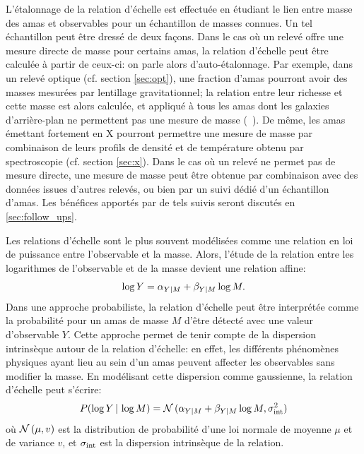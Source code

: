 L'étalonnage de la relation d'échelle est effectuée en étudiant le lien entre masse des amas et observables pour un échantillon de masses connues.
Un tel échantillon peut être dressé de deux façons.
Dans le cas où un relevé offre une mesure directe de masse pour certains amas, la relation d'échelle peut être calculée à partir de ceux-ci: on parle alors d'auto-étalonnage.
Par exemple, dans un relevé optique (cf. section \ref{sec:opt}), une fraction d'amas pourront avoir des masses mesurées par lentillage gravitationnel; la relation entre leur richesse et cette masse est alors calculée, et appliqué à tous les amas dont les galaxies d'arrière-plan ne permettent pas une mesure de masse (\eg\ \cite{andreon_richness-mass_2012}).
De même, les amas émettant fortement en X pourront permettre une mesure de masse par combinaison de leurs profils de densité et de température obtenu par spectroscopie (cf. section \ref{sec:x}).
Dans le cas où un relevé ne permet pas de mesure directe, une mesure de masse peut être obtenue par combinaison avec des données issues d'autres relevés, ou bien par un suivi dédié d'un échantillon d'amas.
Les bénéfices apportés par de tels suivis seront discutés en \ref{sec:follow_ups}.

Les relations d'échelle sont le plus souvent modélisées comme une relation en loi de puissance entre l'observable et la masse.
Alors, l'étude de la relation entre les logarithmes de l'observable et de la masse devient une relation affine:
\begin{equation}
    \label{eq:scaling_noproba}
    \log Y = \alpha_{Y|M} + \beta_{Y|M} \log M.
\end{equation}
Dans une approche probabiliste, la relation d'échelle peut être interprétée comme la probabilité pour un amas de masse $M$ d'être détecté avec une valeur d'observable $Y$.
Cette approche permet de tenir compte de la dispersion intrinsèque autour de la relation d'échelle: en effet, les différents phénomènes physiques ayant lieu au sein d'un amas peuvent affecter les observables sans modifier la masse.
En modélisant cette dispersion comme gaussienne, la relation d'échelle peut s'écrire:
\begin{equation}
    \label{eq:scaling_pdf}
    P(\log Y \,|\, \log M) = \mathcal{N}\,(\alpha_{Y|M} + \beta_{Y|M} \log M, \sigma_{\rm int}^2)
\end{equation}
où $\mathcal{N}\,(\mu, v)$ est la distribution de probabilité d'une loi normale de moyenne $\mu$ et de variance $v$, et $\sigma_{\rm int}$ est la dispersion intrinsèque de la relation.

